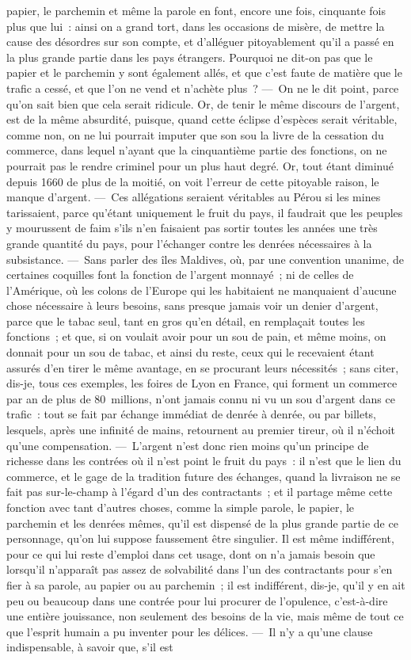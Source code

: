 \documentclass[french,twoside]{book} %
\begin{document}
papier, le parchemin et même la parole en font, encore une fois, cinquante fois plus que lui : ainsi on a grand tort, dans les occasions de misère, de mettre la cause des désordres sur son compte, et d’alléguer pitoyablement qu’il a passé en la plus grande partie dans les pays étrangers. Pourquoi ne dit-on pas que le papier et le parchemin y sont également allés, et que c’est faute de matière que le trafic a cessé, et que l’on ne vend et n’achète plus ? — On ne le dit point, parce qu’on sait bien que cela serait ridicule. Or, de tenir le même discours de l’argent, est de la même absurdité, puisque, quand cette éclipse d’espèces serait véritable, comme non, on ne lui pourrait imputer que son sou la livre de la cessation du commerce, dans lequel n’ayant que la cinquantième partie des fonctions, on ne pourrait pas le rendre criminel pour un plus haut degré. Or, tout étant diminué depuis 1660 de plus de la moitié, on voit l’erreur de cette pitoyable raison, le manque d’argent. — Ces allégations seraient véritables au Pérou si les mines tarissaient, parce qu’étant uniquement le fruit du pays, il faudrait que les peuples y mourussent de faim s’ils n’en faisaient pas sortir toutes les années une très grande quantité du pays, pour l’échanger contre les denrées nécessaires à la subsistance. — Sans parler des îles Maldives, où, par une convention unanime, de certaines coquilles font la fonction de l’argent monnayé ; ni de celles de l’Amérique, où les colons de l’Europe qui les habitaient ne manquaient d’aucune chose nécessaire à leurs besoins, sans presque jamais voir un denier d’argent, parce que le tabac seul, tant en gros qu’en détail, en remplaçait toutes les fonctions ; et que, si on voulait avoir pour un sou de pain, et même moins, on donnait pour un sou de tabac, et ainsi du reste, ceux qui le recevaient étant assurés d’en tirer le même avantage, en se procurant leurs nécessités ; sans citer, dis-je, tous ces exemples, les foires de Lyon en France, qui forment un commerce par an de plus de 80 millions, n’ont jamais connu ni vu un sou d’argent dans ce trafic : tout se fait par échange immédiat de denrée à denrée, ou par billets, lesquels, après une infinité de mains, retournent au premier tireur, où il n’échoit qu’une compensation. — L’argent n’est donc rien moins qu’un principe de richesse dans les contrées où il n’est point le fruit du pays : il n’est que le lien du commerce, et le gage de la tradition future des échanges, quand la livraison ne se fait pas sur-le-champ à l’égard d’un des contractants ; et il partage même cette fonction avec tant d’autres choses, comme la simple parole, le papier, le parchemin et les denrées mêmes, qu’il est dispensé de la plus grande partie de ce personnage, qu’on lui suppose faussement être singulier. Il est même indifférent, pour ce qui lui reste d’emploi dans cet usage, dont on n’a jamais besoin que lorsqu’il n’apparaît pas assez de solvabilité dans l’un des contractants pour s’en fier à sa parole, au papier ou au parchemin ; il est indifférent, dis-je, qu’il y en ait peu ou beaucoup dans une contrée pour lui procurer de l’opulence, c’est-à-dire une entière jouissance, non seulement des besoins de la vie, mais même de tout ce que l’esprit humain a pu inventer pour les délices. — Il n’y a qu’une clause indispensable, à savoir que, s’il est 
\end{document}
